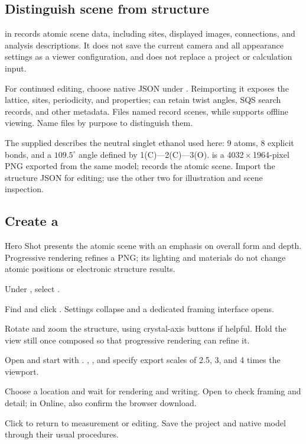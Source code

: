 \subsection{Distinguish scene  from structure }

 in  records atomic scene data, including sites, displayed images, connections, and analysis descriptions. It does not save the current camera and all appearance settings as a viewer configuration, and does not replace a project or calculation input.

For continued editing, choose native JSON under . Reimporting it exposes the lattice, sites, periodicity, and properties;  can retain twist angles, SQS search records, and other metadata. Files named  record scenes, while  supports offline viewing. Name files by purpose to distinguish them.

The supplied  describes the neutral singlet ethanol used here: 9 atoms, 8 explicit bonds, and a $109.5^\circ$ angle defined by 1(C)—2(C)—3(O). \mbox{} is a 4032\,$\times$\,1964-pixel PNG exported from the same model;  records the atomic scene. Import the structure JSON for editing; use the other two for illustration and scene inspection.

\subsection{Create a }

Hero Shot presents the atomic scene with an emphasis on overall form and depth. Progressive rendering refines a PNG; its lighting and materials do not change atomic positions or electronic structure results.

\begin{steps}
\item Under , select .
\item Find  and click . Settings collapse and a dedicated framing interface opens.
\item Rotate and zoom the structure, using crystal-axis buttons if helpful. Hold the view still once composed so that progressive rendering can refine it.
\item Open  and start with . , , and  specify export scales of 2.5, 3, and 4 times the viewport.
\item Choose a location and wait for rendering and writing. Open  to check framing and detail; in Online, also confirm the browser download.
\item Click  to return to measurement or editing. Save the project and native model through their usual procedures.
\end{steps}

